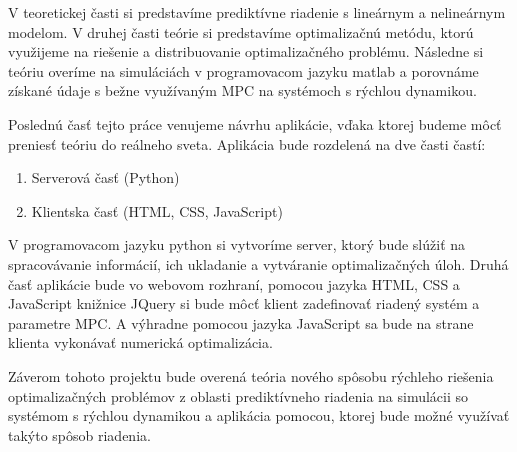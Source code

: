 V teoretickej časti si predstavíme prediktívne riadenie s lineárnym a nelineárnym modelom. V druhej časti teórie si predstavíme optimalizačnú metódu, ktorú využijeme na riešenie a distribuovanie optimalizačného problému. Následne si teóriu overíme na simuláciách v programovacom jazyku matlab a porovnáme získané údaje s bežne využívaným MPC na systémoch s rýchlou dynamikou. 

Poslednú časť tejto práce venujeme návrhu aplikácie, vďaka ktorej budeme môcť preniesť teóriu do reálneho sveta. Aplikácia bude rozdelená na dve časti častí:
\begin{enumerate}
	\item Serverová časť (Python) 
	\item Klientska časť (HTML, CSS, JavaScript) 
\end{enumerate}
V programovacom jazyku python si vytvoríme server, ktorý bude slúžiť na spracovávanie informácií, ich ukladanie a vytváranie optimalizačných úloh. Druhá časť aplikácie bude vo webovom rozhraní, pomocou jazyka HTML, CSS a JavaScript knižnice JQuery si bude môcť klient zadefinovať riadený systém a parametre MPC. A výhradne pomocou jazyka JavaScript sa bude na strane klienta vykonávať numerická optimalizácia. 

Záverom tohoto projektu bude overená teória nového spôsobu rýchleho riešenia optimalizačných problémov z oblasti prediktívneho riadenia na simulácii so systémom s rýchlou dynamikou a aplikácia pomocou, ktorej bude možné využívať takýto spôsob riadenia. 